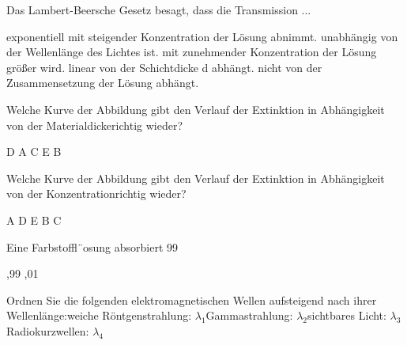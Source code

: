 \documentclass[11pt]{exam}
\begin{document}
\setlength{\voffset}{-0.5in}
\setlength{\headsep}{5pt}

\hspace{2mm}
 \hspace{5mm}
\vspace{4mm}

\begin{questions}

\question Das Lambert-Beersche Gesetz besagt, dass die Transmission ...

\begin{choices}
	\choice exponentiell mit steigender Konzentration der Lösung abnimmt.
	\choice unabhängig von der Wellenlänge des Lichtes ist.
	\choice mit zunehmender Konzentration der Lösung größer wird.
	\choice linear von der Schichtdicke d abhängt.
	\choice nicht von der Zusammensetzung der Lösung abhängt.
\end{choices}

\vspace{3mm}\question Welche Kurve der Abbildung gibt den Verlauf der Extinktion in Abhängigkeit von der Materialdickerichtig wieder?

\begin{choices}
	\choice D
	\choice A
	\choice C
	\choice E
	\choice B
\end{choices}

\vspace{3mm}\question Welche Kurve der Abbildung gibt den Verlauf der Extinktion in Abhängigkeit von der Konzentrationrichtig wieder?

\begin{choices}
	\choice A
	\choice D
	\choice E
	\choice B
	\choice C
\end{choices}

\vspace{3mm}\question Eine Farbstoffl¨osung absorbiert 99 %

\begin{choices}
	,99
	,01
\end{choices}

\vspace{3mm}\question Ordnen Sie die folgenden elektromagnetischen Wellen aufsteigend nach ihrer Wellenlänge:weiche Röntgenstrahlung: \( \lambda_1 \)Gammastrahlung: \( \lambda_2 \)sichtbares Licht: \( \lambda_3 \)Radiokurzwellen: \( \lambda_4 \)


\end{questions}
\end{document}
